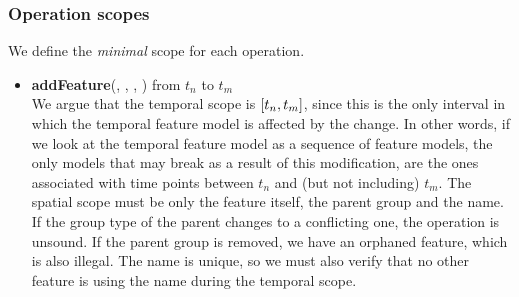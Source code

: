 \subsubsection*{Operation scopes}
We define the \textit{minimal} scope for each operation.
\begin{itemize}

  \item \textbf{addFeature}(, , , ) from $t_n$ to $t_m$\\
     We argue that the temporal scope is $\interval{t_n}{t_m}$, since this is the only interval in which the temporal feature model is affected by the change. In other words, if we look at the temporal feature model as a sequence of feature models, the only models that may break as a result of this modification, are the ones associated with time points between $t_n$ and (but not including) $t_m$. The spatial scope must be only the feature itself, the parent group and the name. If the group type of the parent changes to a conflicting one, the operation is unsound. If the parent group is removed, we have an orphaned feature, which is also illegal. The name is unique, so we must also verify that no other feature is using the name during the temporal scope. 
 


\end{itemize}
